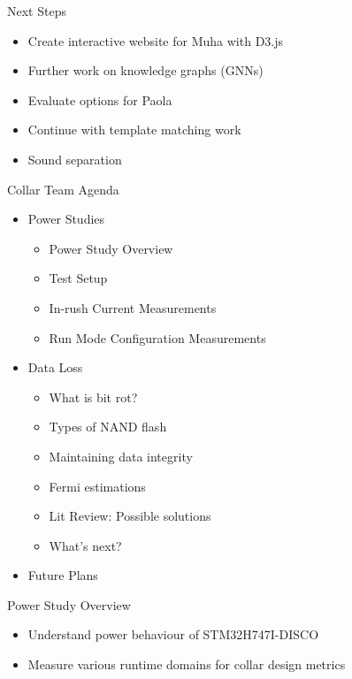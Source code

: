 \begin{frame}{Next Steps}
    \begin{itemize}
        \item Create interactive website for Muha with D3.js
        \item Further work on knowledge graphs (GNNs)
        \item Evaluate options for Paola
        \item Continue with template matching work
        \item Sound separation
    \end{itemize}
\end{frame}

\begin{frame}{Collar Team Agenda}
    \begin{itemize}
        \item Power Studies
        \begin{itemize}
            \item Power Study Overview
            \item Test Setup 
            \item In-rush Current Measurements
            \item Run Mode Configuration Measurements
        \end{itemize}
        \item Data Loss
        \begin{itemize}
            \item What is bit rot?
            \item Types of NAND flash
            \item Maintaining data integrity
            \item Fermi estimations
            \item Lit Review: Possible solutions
            \item What's next?
        \end{itemize}
        \item Future Plans
    \end{itemize}
\end{frame}

\begin{frame}{Power Study Overview}
    \begin{itemize}
        \item Understand power behaviour of STM32H747I-DISCO
        \item Measure various runtime domains for collar design metrics
    \end{itemize}
\end{frame}

